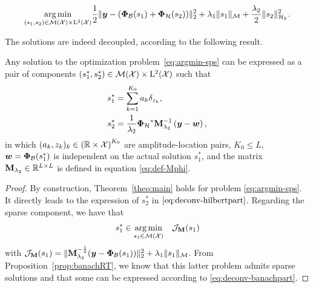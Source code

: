         \begin{equation}
        \label{eq:argmin-sps}
            \underset{(s_1,s_2) \in {\mathcal{M}}({\mathcal{X}}) \times \mathrm{L}^2(\mathcal{X})}{\arg\min} \frac{1}{2} \| \bm{y} - ({\bm{\Phi}_\mathcal{B}} (s_1) + {\bm{\Phi}_\mathcal{H}} (s_2)) \|_2^2  + \lambda_{1} \| s_1 \|_{\mathcal{M}} + \frac{\lambda_{2}}{2} \| s_2 \|_{\mathcal{H}_k}^2.
        \end{equation}

        The solutions are indeed decoupled, according to the following result.
        \begin{proposition}
            \label{prop:rt-applied}
            Any solution to the optimization problem~\eqref{eq:argmin-sps} can be expressed as a pair of components $(s_1^*, s_2^*) \in {\mathcal{M}}({\mathcal{X}}) \times \mathrm{L}^2(\mathcal{X})$ such that
            \begin{align}
                s_1^* &= \sum_{k=1}^{K_0} a_k \delta_{z_k}, \label{eq:deconv-banachpart}\\
                s_2^* &=  \frac{1}{\lambda_{2}}{\bm{\Phi}_\mathcal{H}}^* \mathbf{M}_{\lambda_{2}}^{-1} \left(\bm{y} - \bm{w}\right),\label{eq:deconv-hilbertpart}
            \end{align}
            in which $(a_k, z_k)_k \in \left(\mathbb{R} \times \mathcal{X}\right)^{K_0} $ are amplitude-location pairs, $K_0 \leq L$, $\bm{w} = {\bm{\Phi}_\mathcal{B}}(s_1^*)$ is independent on the actual solution $s_1^*$, and the matrix $\mathbf{M}_{\lambda_2} \in \mathbb{R}^{L \times L}$ is defined in equation \eqref{eq:def-Mphi}.
        \end{proposition}

        \begin{proof}
            By construction, Theorem~\ref{theo:main} holds for problem \eqref{eq:argmin-sps}. It directly leads to the expression of $s_2^*$ in $\eqref{eq:deconv-hilbertpart}$. Regarding the sparse component, we have that
            \begin{equation*}
                s_1^* \in \underset{ s_1\in{\mathcal{M}}({\mathcal{X}})}{\arg\min} \quad  \mathcal{J}_{\mathbf{M}}(s_1)
            \end{equation*}
            with $\mathcal{J}_{\mathbf{M}}(s_1) = \|\mathbf{M}_{\lambda_{2}}^{-\frac{1}{2}} ( \bm{y} - {\bm{\Phi}_\mathcal{B}}(s_1)  ) \|_2^2  + \lambda_{1} \| s_1 \|_{\mathcal{M}}$. From Proposition~\ref{prop:banachRT}, we know that this latter problem admits sparse solutions and that some can be expressed according to \eqref{eq:deconv-banachpart}.
        \end{proof}

